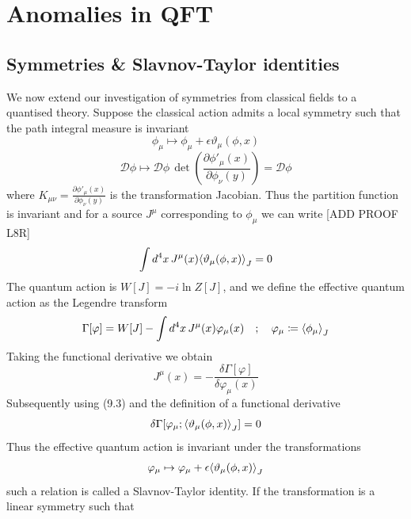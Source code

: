 \documentclass[11pt, a4paper]{article}
\theoremstyle{definition}
\theoremstyle{plain}
\begin{document}
\section{Anomalies in QFT}

\subsection{Symmetries \& Slavnov-Taylor identities}
We now extend our investigation of symmetries from classical fields to a
quantised theory. Suppose the classical action admits a local symmetry
such that the path integral measure is invariant
\begin{equation}
  \phi_\mu \mapsto \phi_\mu + \epsilon\vartheta_\mu(\phi, x)
\end{equation}
\begin{equation}
  \mathcal{D}\phi \mapsto
  \mathcal{D}\phi\,\det\!{\left(\frac{\partial \phi'_{\mu}(x)}{\partial \phi_\nu(y)}\right)}
  = \mathcal{D}\phi
\end{equation}
where $K_{\mu\nu} = \frac{\partial \phi'_{\mu}(x)}{\partial \phi_\nu(y)}$ is the 
transformation Jacobian. Thus the partition function is invariant
and for a source $J^\mu$ corresponding to $\phi_\mu$ we can write [ADD PROOF L8R]
\begin{equation}
  \int{d^4x\,J^\mu(x)\!\braket{\vartheta_\mu(\phi, x)}}_J = 0
\end{equation}
The quantum action is $W[J] = -i\ln{Z[J]}$, and 
we define the effective quantum action as the Legendre transform
\begin{equation}
  \Gamma[\varphi] = W[J] - \int{d^4x\,J^\mu(x)\varphi_\mu(x)} \quad; 
  \quad \varphi_\mu \coloneq \braket{\phi_\mu}_J
\end{equation}
Taking the functional derivative we obtain
\begin{equation}
  J^\mu(x) = - \frac{\delta \Gamma[\varphi]}{\delta \varphi_\mu(x)}
\end{equation}
Subsequently using (9.3) and the definition of a functional derivative 
\begin{equation}
  \delta\Gamma[\varphi_\mu;\braket{\vartheta_\mu(\phi, x)}_J] = 0
\end{equation}
Thus the effective quantum action is invariant under the transformations
\begin{equation}
  \varphi_\mu \mapsto \varphi_\mu + \epsilon\!\braket{\vartheta_\mu(\phi, x)}_J 
\end{equation}
such a relation is called a Slavnov-Taylor identity.
If the transformation is a linear symmetry such that
\end{document}
